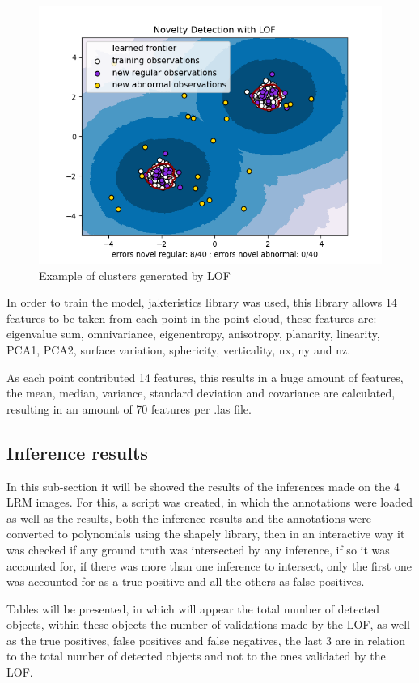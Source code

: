 \begin{figure}[H]
\centering
\includegraphics[]{images/lof_example.png}
\caption{Example of clusters generated by LOF}
\end{figure}

In order to train the model, jakteristics library was used, this library allows 14 features to be taken from each point in the point cloud, these features are: eigenvalue sum, omnivariance, eigenentropy, anisotropy, planarity, linearity, PCA1, PCA2, surface variation, sphericity, verticality, nx, ny and nz.

As each point contributed 14 features, this results in a huge amount of features, the mean, median, variance, standard deviation and covariance are calculated, resulting in an amount of 70 features per .las file.

\subsection{Inference results}
In this sub-section it will be showed the results of the inferences made on the 4 LRM images. For this, a script was created, in which the annotations were loaded as well as the results, both the inference results and the annotations were converted to polynomials using the shapely library, then in an interactive way it was checked if any ground truth was intersected by any inference, if so it was accounted for, if there was more than one inference to intersect, only the first one was accounted for as a true positive and all the others as false positives.

Tables will be presented, in which will appear the total number of detected objects, within these objects the number of validations made by the LOF, as well as the true positives, false positives and false negatives, the last 3 are in relation to the total number of detected objects and not to the ones validated by the LOF.

